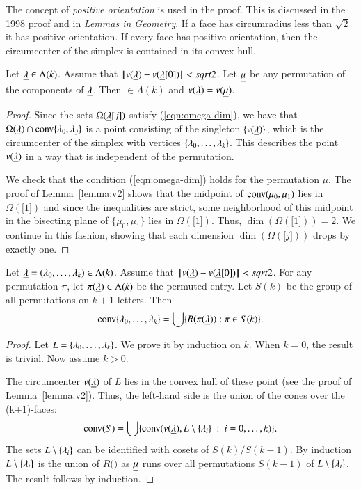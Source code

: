 \begin{note}%
The concept of {\it positive orientation} is used in the proof.  This is discussed in the 1998 proof and in {\it Lemmas in Geometry}.  If a face has circumradius less than $\sqrt2$ it has positive orientation.  If every face has positive orientation, then the circumcenter of the simplex is contained in its convex hull.
\end{note}

\begin{lemma}   
Let ${\underline{\lambda}}\in\Lambda(k)$.  Assume that ${\hskip0.1em|\hskip-0.15em|\hskip0.1em}v({\underline{\lambda}}) - v({\underline{\lambda}}[0]){\hskip0.1em|\hskip-0.15em|\hskip0.1em}<sqrt2$. Let ${\underline{\mu}}$ be any permutation of the components of ${\underline{\lambda}}$.  Then $\bm\in\Lambda(k)$ and  $v({\underline{\lambda}}) = v({\underline{\mu}})$.
\end{lemma}

\begin{proof} 
Since the sets $\Omega({\underline{\lambda}}[j])$ satisfy (\ref{eqn:omega-dim}), we have that
$\Omega({\underline{\lambda}})\cap {\operatorname{conv}}\{\lambda_0,\lambda_j\}$ is a point consisting of the singleton $\{v({\underline{\lambda}})\}$, which is the
circumcenter of the simplex with vertices $\{\lambda_0,\ldots,\lambda_k\}$.  This describes
the point $v({\underline{\lambda}})$ in a way that is independent of the permutation.

We check that the condition (\ref{eqn:omega-dim}) holds for the permutation $\mu$.
The proof of Lemma~\ref{lemma:v2} shows that the midpoint of ${\operatorname{conv}}(\mu_0,\mu_1)$
lies in $\Omega(\bm[1])$ and since the inequalities are strict, some neighborhood
of this midpoint in the bisecting plane of $\{\mu_0,\mu_1\}$ lies in $\Omega(\bm[1])$.
Thus, $\dim(\Omega(\bm[1]))=2$.  We continue in this fashion, showing that each dimension
$\dim(\Omega(\bm[j]))$ drops by exactly one.
\end{proof}

\begin{lemma}\label{lemma:Rconv} Let ${\underline{\lambda}} = (\lambda_0,\ldots,\lambda_k)\in\Lambda(k)$.  Assume that ${\hskip0.1em|\hskip-0.15em|\hskip0.1em}v({\underline{\lambda}}) - v({\underline{\lambda}}[0]){\hskip0.1em|\hskip-0.15em|\hskip0.1em}<sqrt2$.
For any permutation $\pi$, let $\pi({\underline{\lambda}})\in\Lambda(k)$ be the permuted entry.  Let
$S(k)$ be the group of all permutations on $k+1$ letters.   Then
$$
{\operatorname{conv}}\{\lambda_0,\ldots,\lambda_k\} = \bigcup \{ R(\pi({\underline{\lambda}})) : \pi\in S(k)\}.
$$
\end{lemma}

\begin{proof} Let $L = \{\lambda_0,\ldots,\lambda_k\}$.  We prove it by induction on $k$.
When $k=0$, the result is trivial.  Now assume $k>0$.

The circumcenter $v({\underline{\lambda}})$ of $L$ lies in the convex hull of these
point (see the proof of Lemma~\ref{lemma:v2}).  Thus, the left-hand side is the union
of the cones over the (k+1)-faces:
$$
{\operatorname{conv}}(S) = \bigcup\{ {\operatorname{conv}}(v({\underline{\lambda}}),L\setminus \{\lambda_i\}\ :\  i=0,\ldots,k) \}.
$$
The sets $L\setminus \{\lambda_i\}$ can be identified with  cosets of $S(k)/S(k-1)$.
By induction $L\setminus \{\lambda_i\}$ is the union of $R(\bm)$ as ${\underline{\mu}}$ runs
over all permutations $S(k-1)$ of $L\setminus \{\lambda_i\}$.
The result follows by induction.
\end{proof}


